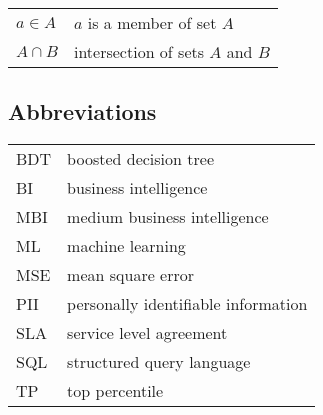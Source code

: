 \begin{tabular}{ll}
$a \in A$    & $a$ is a member of set $A$ \\
$A \cap B$   & intersection of sets $A$ and $B$ \\
\end{tabular}

\subsection*{Abbreviations}

\begin{tabular}{ll}
BDT         & boosted decision tree \\
BI          & business intelligence \\
MBI         & medium business intelligence \\
ML          & machine learning \\
MSE         & mean square error \\
PII         & personally identifiable information \\
SLA         & service level agreement \\
SQL         & structured query language \\
TP          & top percentile \\
\end{tabular}

